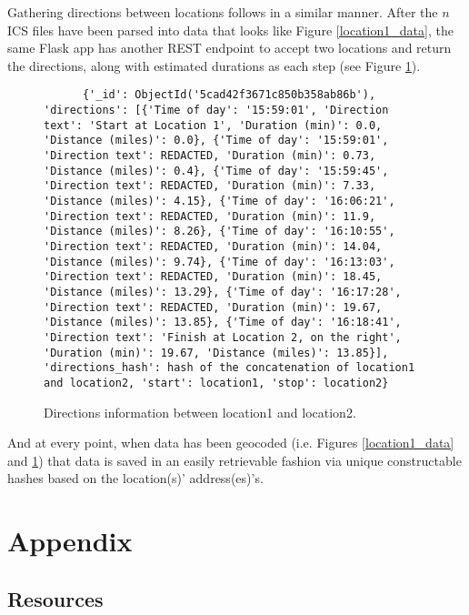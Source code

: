\documentclass[11 pt]{IEEEtran}
\theoremstyle{definition}
\theoremstyle{definition}
\begin{document}
Gathering directions between locations follows in a similar manner. After the $n$ ICS files have been parsed into data that looks like Figure \ref{location1_data}, the same Flask app has another REST endpoint to accept two locations and return the directions, along with estimated durations as each step (see Figure \ref{location1_location2_directions}).

\begin{figure}
  \begin{center}
    \begin{lstlisting}
      {'_id': ObjectId('5cad42f3671c850b358ab86b'), 'directions': [{'Time of day': '15:59:01', 'Direction text': 'Start at Location 1', 'Duration (min)': 0.0, 'Distance (miles)': 0.0}, {'Time of day': '15:59:01', 'Direction text': REDACTED, 'Duration (min)': 0.73, 'Distance (miles)': 0.4}, {'Time of day': '15:59:45', 'Direction text': REDACTED, 'Duration (min)': 7.33, 'Distance (miles)': 4.15}, {'Time of day': '16:06:21', 'Direction text': REDACTED, 'Duration (min)': 11.9, 'Distance (miles)': 8.26}, {'Time of day': '16:10:55', 'Direction text': REDACTED, 'Duration (min)': 14.04, 'Distance (miles)': 9.74}, {'Time of day': '16:13:03', 'Direction text': REDACTED, 'Duration (min)': 18.45, 'Distance (miles)': 13.29}, {'Time of day': '16:17:28', 'Direction text': REDACTED, 'Duration (min)': 19.67, 'Distance (miles)': 13.85}, {'Time of day': '16:18:41', 'Direction text': 'Finish at Location 2, on the right', 'Duration (min)': 19.67, 'Distance (miles)': 13.85}], 'directions_hash': hash of the concatenation of location1 and location2, 'start': location1, 'stop': location2}
    \end{lstlisting}
    \caption{Directions information between location1 and location2.}\label{location1_location2_directions}
  \end{center}
\end{figure}

And at every point, when data has been geocoded (i.e. Figures \ref{location1_data} and \ref{location1_location2_directions}) that data is saved in an easily retrievable fashion via unique constructable hashes based on the location(s)' address(es)'s.



\newpage
\section{Appendix}
\subsection{Resources}
\end{document}
